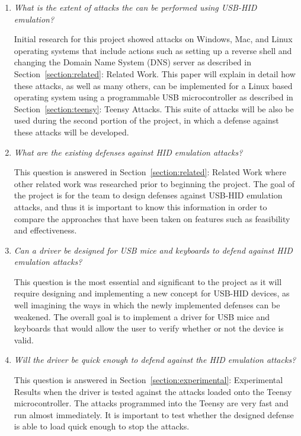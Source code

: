 \documentclass[pagenumbers]{ieee}
\begin{document}
\begin{enumerate}
\item \textit{What is the extent of attacks the can be performed using USB-HID emulation?}

Initial research for this project showed attacks on Windows, Mac, and Linux operating systems that include actions such as setting up a reverse shell and changing the Domain Name System (DNS) server as described in Section~\ref{section:related}: Related Work. This paper will explain in detail how these attacks, as well as many others, can be implemented for a Linux based operating system using a programmable USB microcontroller as described in Section~\ref{section:teensy}: Teensy Attacks. This suite of attacks will be also be used during the second portion of the project, in which a defense against these attacks will be developed.

\item \textit{What are the existing defenses against HID emulation attacks?}

This question is answered in Section~\ref{section:related}: Related Work where other related work was researched prior to beginning the project. The goal of the project is for the team to design defenses against USB-HID emulation attacks, and thus it is important to know this information  in order to compare the approaches that have been taken on features such as feasibility and effectiveness.

\item \textit{Can a driver be designed for USB mice and keyboards to defend against HID emulation attacks?}

This question is the most essential and significant to the project as it will require designing and implementing a new concept for USB-HID devices, as well imagining the ways in which the newly implemented defenses can be weakened. The overall goal is to implement a driver for USB mice and keyboards that would allow the user to verify whether or not the device is valid.

\item \textit{Will the driver be quick enough to defend against the HID emulation attacks?}

This question is answered in Section~\ref{section:experimental}: Experimental Results when the driver is tested against the attacks loaded onto the Teensy microcontroller. The attacks programmed into the Teensy are very fast and run almost immediately. It is important to test whether the designed defense is able to load quick enough to stop the attacks.


\end{enumerate}
\end{document}
